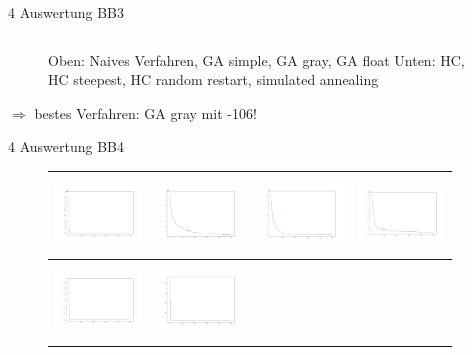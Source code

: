 \documentclass{ocbeameruni}
\begin{document}
\begin{frame}{4 Auswertung BB3}
\begin{center}
\begin{figure}
\begin{tabular}{|c|c|c|c|}
    \end{tabular}
    \caption{Oben: Naives Verfahren, GA simple, GA gray, GA float \hspace{\textwidth}Unten: HC, HC steepest, HC random restart, simulated annealing}
    \end{figure}
    $\Rightarrow$ bestes Verfahren: GA gray mit -106!
    \end{center}
\end{frame}

\begin{frame}{4 Auswertung BB4}
    \begin{center}
    \begin{figure}
    \begin{tabular}{|c|c|c|c|} 
      \hline
      \includegraphics[width=23mm, height=20mm]{plots/bb4_naive.png} 
    & \includegraphics[width=23mm, height=20mm]{plots/bb4_ga_simple.png} 
    & \includegraphics[width=23mm, height=20mm]{plots/bb4_ga_gray.png}
    & \includegraphics[width=23mm, height=20mm]{plots/bb4_ga_float.png} \\ \hline
      \includegraphics[width=23mm, height=20mm]{plots/bb4_hc.png} 
    & \includegraphics[width=23mm, height=20mm]{plots/bb4_hc_sa.png} 

\end{tabular}
\end{figure}
\end{center}
\end{frame}
\end{document}
